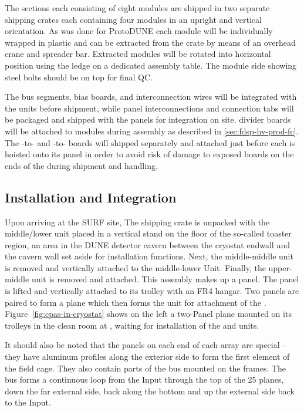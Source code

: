 The  sections each consisting of eight modules are shipped in two separate shipping crates each containing four modules in an upright and vertical orientation.
As was done for ProtoDUNE each  module will be individually wrapped in plastic 
and can be extracted from the crate by means of an overhead crane and spreader bar.
Extracted modules will be rotated into horizontal position using the ledge on a dedicated assembly table. The module side showing steel bolts should be on top for final QC. 


The  bus segments,  bias boards, and  interconnection wires will be integrated with the  units before shipment, while  panel interconnections and  connection tabs will be packaged and shipped with the  panels for integration on site.
 divider boards will be attached to  modules during  assembly as described in \ref{sec:fdsp-hv-prod-fc}.
The -to- and -to- boards will shipped separately and attached just before each  is hoisted onto its  panel in order to avoid risk of damage to exposed boards on the ends of the  during shipment and handling.


\subsection{Installation and Integration}
\label{sec:fdsp-hv-integration}
Upon arriving at the SURF site, The  shipping crate is unpacked with the middle/lower  unit placed in a vertical stand on the floor of the so-called toaster region, an area in the DUNE detector cavern between the cryostat endwall and the cavern wall set aside for installation functions.  Next, the middle-middle  unit is removed and vertically attached to the middle-lower Unit.  Finally, the upper-middle  unit is removed and attached.  This assembly makes up a  panel.  The  panel is lifted and vertically attached to its trolley with an FR4 hangar.  Two  panels are paired to form a   plane which then forms the unit for attachment of the .  Figure~\ref{fig:cpas-in-cryostat} shows on the left a two-Panel  plane mounted on its trolleys in the clean room at , waiting for installation of the  and  units.

It should also be noted that the  panels on each end of each  array are special -- they have aluminum profiles along the exterior side to form the first element of the field cage.  They also contain parts of the  bus mounted on the  frames.  The  bus forms a continuous loop from the  Input through the top of the 25  planes, down the far external side, back along the bottom and up the  external side back to the  Input.

